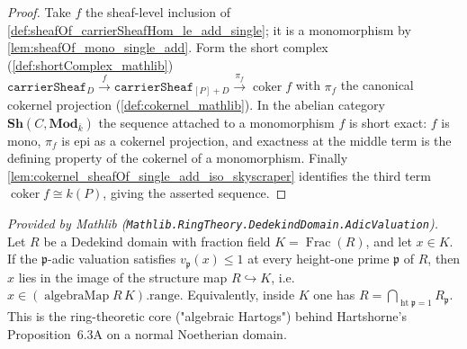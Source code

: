 \begin{proof}
  Take \(f\) the sheaf-level inclusion of
  \cref{def:sheafOf_carrierSheafHom_le_add_single}; it is a monomorphism by
  \cref{lem:sheafOf_mono_single_add}. Form the short complex
  (\cref{def:shortComplex_mathlib})
  \(\texttt{carrierSheaf}_D \xrightarrow{f} \texttt{carrierSheaf}_{[P]+D}
  \xrightarrow{\pi_f} \operatorname{coker} f\) with \(\pi_f\) the canonical
  cokernel projection (\cref{def:cokernel_mathlib}). In the abelian category
  \(\mathbf{Sh}(C, \mathbf{Mod}_{\bar k})\) the sequence attached to a
  monomorphism \(f\) is short exact: \(f\) is mono, \(\pi_f\) is epi as a
  cokernel projection, and exactness at the middle term is the defining
  property of the cokernel of a monomorphism. Finally
  \cref{lem:cokernel_sheafOf_single_add_iso_skyscraper} identifies the third
  term \(\operatorname{coker} f \cong k(P)\), giving the asserted sequence.
\end{proof}

\begin{lemma}
  \label{lem:mem_integers_of_valuation_le_one}
  \mathlibok
  \textit{Provided by Mathlib (\texttt{Mathlib.RingTheory.DedekindDomain.AdicValuation}).}
  Let \(R\) be a Dedekind domain with fraction field
  \(K = \operatorname{Frac}(R)\), and let \(x \in K\). If the
  \(\mathfrak p\)-adic valuation satisfies \(v_{\mathfrak p}(x) \le 1\) at every
  height-one prime \(\mathfrak p\) of \(R\), then \(x\) lies in the image of the
  structure map \(R \hookrightarrow K\), i.e.\
  \(x \in (\operatorname{algebraMap} R\,K).\mathrm{range}\). Equivalently, inside
  \(K\) one has \(R = \bigcap_{\operatorname{ht}\mathfrak p = 1} R_{\mathfrak p}\).
  This is the ring-theoretic core ("algebraic Hartogs") behind
  Hartshorne's Proposition~6.3A on a normal Noetherian domain.
\end{lemma}

